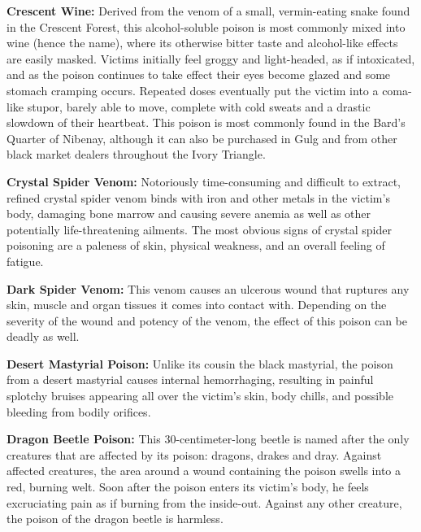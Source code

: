 \textbf{Crescent Wine:} Derived from the venom of a small, vermin-eating snake found in the Crescent Forest, this alcohol-soluble poison is most commonly mixed into wine (hence the name), where its otherwise bitter taste and alcohol-like effects are easily masked. Victims initially feel groggy and light-headed, as if intoxicated, and as the poison continues to take effect their eyes become glazed and some stomach cramping occurs. Repeated doses eventually put the victim into a coma-like stupor, barely able to move, complete with cold sweats and a drastic slowdown of their heartbeat. This poison is most commonly found in the Bard's Quarter of Nibenay, although it can also be purchased in Gulg and from other black market dealers throughout the Ivory Triangle.

\textbf{Crystal Spider Venom:} Notoriously time-consuming and difficult to extract, refined crystal spider venom binds with iron and other metals in the victim's body, damaging bone marrow and causing severe anemia as well as other potentially life-threatening ailments. The most obvious signs of crystal spider poisoning are a paleness of skin, physical weakness, and an overall feeling of fatigue.

\textbf{Dark Spider Venom:} This venom causes an ulcerous wound that ruptures any skin, muscle and organ tissues it comes into contact with. Depending on the severity of the wound and potency of the venom, the effect of this poison can be deadly as well.

\textbf{Desert Mastyrial Poison:} Unlike its cousin the black mastyrial, the poison from a desert mastyrial causes internal hemorrhaging, resulting in painful splotchy bruises appearing all over the victim's skin, body chills, and possible bleeding from bodily orifices.

\textbf{Dragon Beetle Poison:} This 30-centimeter-long beetle is named after the only creatures that are affected by its poison: dragons, drakes and dray. Against affected creatures, the area around a wound containing the poison swells into a red, burning welt. Soon after the poison enters its victim's body, he feels excruciating pain as if burning from the inside-out. Against any other creature, the poison of the dragon beetle is harmless.

